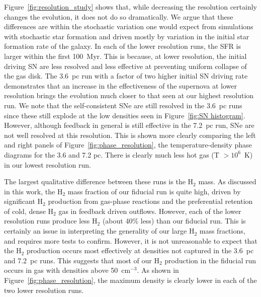 \documentclass[twocolumn]{aastex61}
\begin{document}
Figure~\ref{fig:resolution_study} shows that, while decreasing the resolution certainly changes the evolution, it does not do so dramatically. We argue that these differences are within the stochastic variation one would expect from simulations with stochastic star formation and driven mostly by variation in the initial star formation rate of the galaxy. In each of the lower resolution runs, the SFR is larger within the first 100~Myr. This is because, at lower resolution, the initial driving SN are less resolved and less effective at preventing uniform collapse of the gas disk. The 3.6~pc run with a factor of two higher initial SN driving rate demonstrates that an increase in the effectiveness of the supernova at lower resolution brings the evolution much closer to that seen at our highest resolution run. We note that the self-consistent SNe are still resolved in the 3.6~pc runs since these still explode at the low densities seen in Figure~\ref{fig:SN histogram}. However, although feedback in general is still effective in the 7.2~pc run, SNe are not well resolved at this resolution. This is shown more clearly comparing the left and right panels of Figure~\ref{fig:phase_resolution}, the temperature-density phase diagrams for the 3.6 and 7.2 pc. There is clearly much less hot gas (T $> 10^6$~K) in our lowest resolution run. 

The largest qualitative difference between these runs is the H$_2$ mass. As discussed in this work, the H$_2$ mass fraction of our fiducial run is quite high, driven by significant H$_2$ production from gas-phase reactions and the preferential retention of cold, dense H$_2$ gas in feedback driven outflows. However, each of the lower resolution runs produce less H$_2$ (about 40\% less) than our fiducial run. This is certainly an issue in interpreting the generality of our large H$_2$ mass fractions, and requires more tests to confirm. However, it is not unreasonable to expect that the H$_2$ production occurs most effectively at densities not captured in the 3.6~pc and 7.2~pc runs. This suggests that most of our H$_2$ production in the fiducial run occurs in gas with densities above 50~cm$^{-3}$. As shown in Figure~\ref{fig:phase_resolution}, the maximum density is clearly lower in each of the two lower resolution runs.
\end{document}
